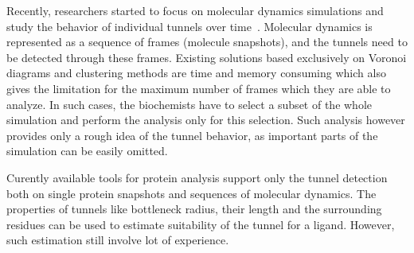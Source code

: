 \documentclass{llncs}
\begin{document}
Recently, researchers started to focus on molecular dynamics simulations and study the behavior of individual tunnels over time~\cite{yaffe2008,caver3,sehnal2013mole}.
Molecular dynamics is represented as a sequence of frames (molecule snapshots), and the tunnels need to be detected through these frames.
Existing solutions based exclusively on Voronoi diagrams and clustering methods are time and memory consuming
which also gives the limitation for the maximum number of frames which they are able to analyze.
In such cases, the biochemists have to select a subset of the whole simulation and perform the analysis only for this selection.
Such analysis however provides only a rough idea of the tunnel behavior, as important parts of the simulation can be easily omitted.


Curently available tools for protein analysis support only the tunnel detection both on single protein snapshots and sequences
of molecular dynamics.
The properties of tunnels like bottleneck radius, their length and the surrounding residues can be used
to estimate suitability of the tunnel for a ligand.
However, such estimation still involve lot of experience.
\end{document}
